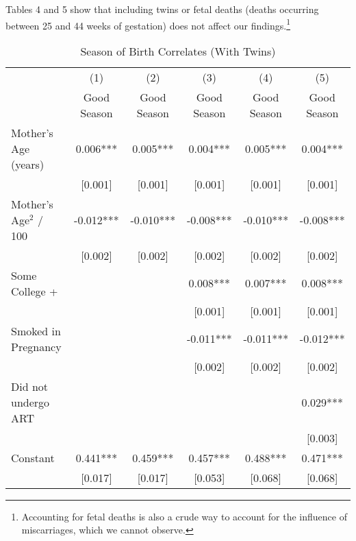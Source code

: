 \documentclass[a4paper, 11.5 pt]{article}
\theoremstyle{plain}
\begin{document}
\begin{doublespace}
Tables 4 and 5 show that including twins or fetal deaths (deaths occurring between 25 and 44 weeks of gestation) does not affect our findings.\footnote{ Accounting for fetal deaths is also a crude way to account for the influence of miscarriages, which we cannot observe.}


\begin{table}[htbp]\centering
\def\sym#1{\ifmmode^{#1}\else\(^{#1}\)\fi}
\caption{Season of Birth Correlates (With Twins) \label{tab:bqTwinS}}
\begin{tabular}{l*{5}{c}}
\toprule
                    &\multicolumn{1}{c}{(1)}   &\multicolumn{1}{c}{(2)}   &\multicolumn{1}{c}{(3)}   &\multicolumn{1}{c}{(4)}   &\multicolumn{1}{c}{(5)}   \\
                    & Good Season   & Good Season   & Good Season   & Good Season   & Good Season   \\
\midrule
Mother's Age (years)&       0.006***&       0.005***&       0.004***&       0.005***&       0.004***\\
                    &     [0.001]   &     [0.001]   &     [0.001]   &     [0.001]   &     [0.001]   \\
Mother's Age$^2$ / 100&      -0.012***&      -0.010***&      -0.008***&      -0.010***&      -0.008***\\
                    &     [0.002]   &     [0.002]   &     [0.002]   &     [0.002]   &     [0.002]   \\
Some College +      &               &               &       0.008***&       0.007***&       0.008***\\
                    &               &               &     [0.001]   &     [0.001]   &     [0.001]   \\
Smoked in Pregnancy &               &               &      -0.011***&      -0.011***&      -0.012***\\
                    &               &               &     [0.002]   &     [0.002]   &     [0.002]   \\
Did not undergo ART &               &               &               &               &       0.029***\\
                    &               &               &               &               &     [0.003]   \\
Constant            &       0.441***&       0.459***&       0.457***&       0.488***&       0.471***\\
                    &     [0.017]   &     [0.017]   &     [0.053]   &     [0.068]   &     [0.068]   \\

\end{tabular}
\end{table}
\end{doublespace}
\end{document}
